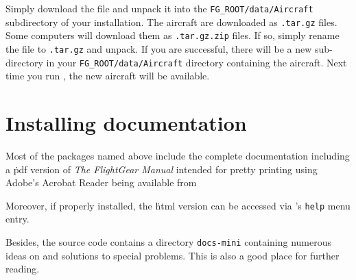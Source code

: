 \medskip
{}
\medskip

Simply download the file and unpack it into the 
\texttt{FG\_ROOT/data/Aircraft} subdirectory of your installation. The 
aircraft are downloaded as \texttt{.tar.gz} files. Some computers will download
them as \texttt{.tar.gz.zip} files. If so, simply rename the file to 
\texttt{.tar.gz} and unpack. If you are successful, there will be a new 
sub-directory in your \texttt{FG\_ROOT/data/Aircraft} directory containing the
aircraft. Next time you run \FlightGear{}, the new aircraft will be available.
 
\section{Installing documentation}

Most of the packages named above include the complete \FlightGear{}
documentation including a \.pdf version of \textit{The FlightGear
Manual} intended for pretty printing using Adobe's Acrobat Reader being
available from
 \medskip

 \medskip

 \noindent
 Moreover, if properly installed, the \.html version can be accessed via
\FlightGear{}'s \texttt{help} menu entry.

Besides, the source code contains a directory \texttt{docs-mini} containing numerous
ideas on and solutions to special problems. This is also a good place for further
reading.

